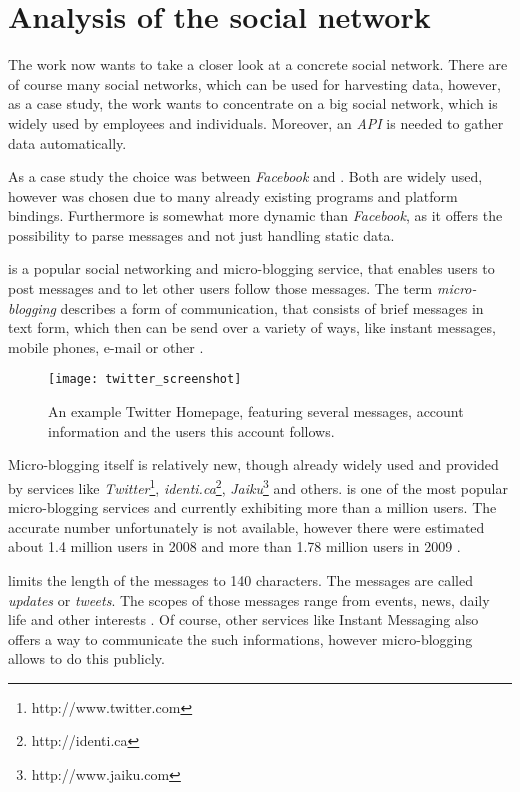 \chapter{Analysis of the social network \Twitter}
\label{chapter:analysis}

The work now wants to take a closer look at a concrete social network.
There are of course many social networks, which can be used for harvesting
data, however, as a case study, the work wants to concentrate on a big social
network, which is widely used by employees and individuals. Moreover,
an \textit{API} is needed to gather data automatically.

As a case study the choice was between \textit{Facebook} and
\Twitter. Both are widely used, however \Twitter{} was chosen due to many
already existing programs and platform bindings. Furthermore \Twitter{} is
somewhat more dynamic than \textit{Facebook}, as it offers the possibility to
parse \Twitter{} messages and not just handling static data.

\Twitter{} is a popular social networking and micro-blogging service, that
enables users to post messages and to let other users follow those messages.
The term \textit{micro-blogging} describes a form of communication, that
consists of brief messages in text form, which then can be send over a variety
of ways, like instant messages, mobile phones, e-mail or other \cite{java2007}.

\begin{figure}[hbt]
  \centering
  \texttt{[image: twitter\_screenshot]}
  \caption{An example Twitter Homepage, featuring several \Twitter{}
  messages, account information and the users this account
  follows.}\label{fig:twitter_screenshot}
\end{figure}

Micro-blogging itself is relatively new, though already widely used and
provided by services like
\textit{Twitter}\footnote{http://www.twitter.com},
\textit{identi.ca}\footnote{http://identi.ca},
\textit{Jaiku}\footnote{http://www.jaiku.com} and others. \Twitter{} is one of
the most popular micro-blogging services \cite{java2007} and currently
exhibiting more than a million users. The accurate number unfortunately is not
available, however there were estimated about 1.4 million users
in 2008 \cite{krishnamurthy2008} and more than 1.78 million users in
2009 \cite{whitworth2009}.

\Twitter{} limits the length of the messages to 140 characters. The messages
are called \textit{updates} or \textit{tweets}. The scopes of those messages
range from events, news, daily life and other interests \cite{java2007}. Of
course, other services like Instant Messaging also offers a way to communicate
the such informations, however micro-blogging allows to do this publicly.

